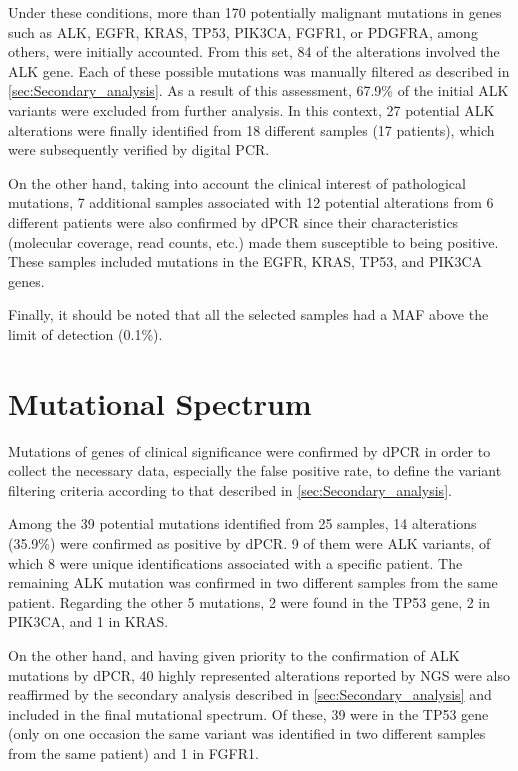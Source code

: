 Under these conditions, more than 170 potentially malignant mutations in genes such as ALK, EGFR, KRAS, TP53, PIK3CA, FGFR1, or PDGFRA, among others, were initially accounted. From this set, 84 of the alterations involved the ALK gene. Each of these possible mutations was manually filtered as described in \autoref{sec:Secondary_analysis}. As a result of this assessment, 67.9\% of the initial ALK variants were excluded from further analysis. In this context, 27 potential ALK alterations were finally identified from 18 different samples (17 patients), which were subsequently verified by digital PCR.

On the other hand, taking into account the clinical interest of pathological mutations, 7 additional samples associated with 12 potential alterations from 6 different patients were also confirmed by dPCR since their characteristics (molecular coverage, read counts, etc.) made them susceptible to being positive. These samples included mutations in the EGFR, KRAS, TP53, and PIK3CA genes.

Finally, it should be noted that all the selected samples had a MAF above the limit of detection (0.1\%).

\section{Mutational Spectrum}

Mutations of genes of clinical significance were confirmed by dPCR in order to collect the necessary data, especially the false positive rate, to define the variant filtering criteria according to that described in \autoref{sec:Secondary_analysis}.

Among the 39 potential mutations identified from 25 samples, 14 alterations (35.9\%) were confirmed as positive by dPCR. 9 of them were ALK variants, of which 8 were unique identifications associated with a specific patient. The remaining ALK mutation was confirmed in two different samples from the same patient. Regarding the other 5 mutations, 2 were found in the TP53 gene, 2 in PIK3CA, and 1 in KRAS.

On the other hand, and having given priority to the confirmation of ALK mutations by dPCR, 40 highly represented alterations reported by NGS were also reaffirmed by the secondary analysis described in \autoref{sec:Secondary_analysis} and included in the final mutational spectrum. Of these, 39 were in the TP53 gene (only on one occasion the same variant was identified in two different samples from the same patient) and 1 in FGFR1.

